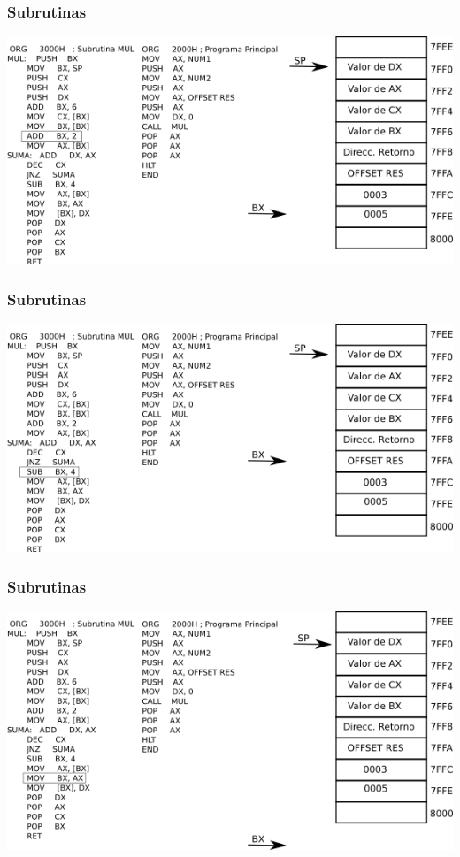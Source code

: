 \documentclass{beamer}
\begin{document}
\begin{frame}
\frametitle{Subrutinas}
\includegraphics[scale=0.70]{imgs/imagen_012.png}
\end{frame}

\begin{frame}
\frametitle{Subrutinas}
\includegraphics[scale=0.70]{imgs/imagen_013.png}
\end{frame}

\begin{frame}
\frametitle{Subrutinas}
\includegraphics[scale=0.70]{imgs/imagen_013_bis.png}
\end{frame}
\end{document}
